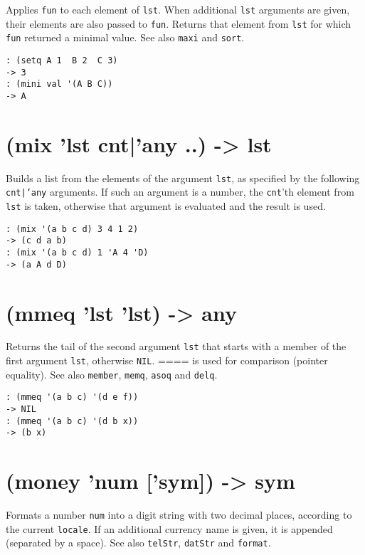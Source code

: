 {{{{{{{Applies \texttt{fun} to each element of \texttt{lst}. When additional \texttt{lst} arguments
are given, their elements are also passed to \texttt{fun}. Returns that element
from \texttt{lst} for which \texttt{fun} returned a minimal value. See also \texttt{maxi} and
\texttt{sort}.


\begin{verbatim}
: (setq A 1  B 2  C 3)
-> 3
: (mini val '(A B C))
-> A
\end{verbatim}

 
\section{(mix 'lst cnt|'any ..) -> lst}
\label{sec-8-1-13-29}


Builds a list from the elements of the argument \texttt{lst}, as specified by
the following \texttt{cnt|'any} arguments. If such an argument is a number, the
\texttt{cnt}'th element from \texttt{lst} is taken, otherwise that argument is
evaluated and the result is used.


\begin{verbatim}
: (mix '(a b c d) 3 4 1 2)
-> (c d a b)
: (mix '(a b c d) 1 'A 4 'D)
-> (a A d D)
\end{verbatim}

 
\section{(mmeq 'lst 'lst) -> any}
\label{sec-8-1-13-30}


Returns the tail of the second argument \texttt{lst} that starts with a member
of the first argument \texttt{lst}, otherwise \texttt{NIL}. ==== is used for
comparison (pointer equality). See also \texttt{member}, \texttt{memq}, \texttt{asoq} and
\texttt{delq}.


\begin{verbatim}
: (mmeq '(a b c) '(d e f))
-> NIL
: (mmeq '(a b c) '(d b x))
-> (b x)
\end{verbatim}

 
\section{(money 'num ['sym]) -> sym}
\label{sec-8-1-13-31}


Formats a number \texttt{num} into a digit string with two decimal places,
according to the current \texttt{locale}. If an additional currency name is
given, it is appended (separated by a space). See also \texttt{telStr},
\texttt{datStr} and \texttt{format}.


}}}}}}}
